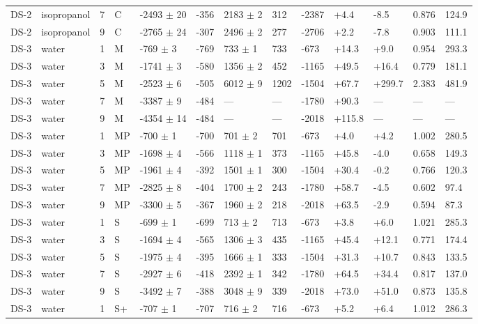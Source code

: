 \documentclass[11pt,a4paper]{article}
\begin{document}
\begin{landscape}
{\begin{longtable}{@{}lllllllllllll@{}}
DS-2 & isopropanol & 7 & C & -2493 $\pm$ 20 & -356 & 2183 $\pm$ 2 & 312 & -2387 & +4.4 & -8.5 & 0.876 & 124.9 \\
DS-2 & isopropanol & 9 & C & -2765 $\pm$ 24 & -307 & 2496 $\pm$ 2 & 277 & -2706 & +2.2 & -7.8 & 0.903 & 111.1 \\
DS-3 & water & 1 & M & -769 $\pm$ 3 & -769 & 733 $\pm$ 1 & 733 & -673 & +14.3 & +9.0 & 0.954 & 293.3 \\
DS-3 & water & 3 & M & -1741 $\pm$ 3 & -580 & 1356 $\pm$ 2 & 452 & -1165 & +49.5 & +16.4 & 0.779 & 181.1 \\
DS-3 & water & 5 & M & -2523 $\pm$ 6 & -505 & 6012 $\pm$ 9 & 1202 & -1504 & +67.7 & +299.7 & 2.383 & 481.9 \\
DS-3 & water & 7 & M & -3387 $\pm$ 9 & -484 & --- & --- & -1780 & +90.3 & --- & --- & --- \\
DS-3 & water & 9 & M & -4354 $\pm$ 14 & -484 & --- & --- & -2018 & +115.8 & --- & --- & --- \\
DS-3 & water & 1 & MP & -700 $\pm$ 1 & -700 & 701 $\pm$ 2 & 701 & -673 & +4.0 & +4.2 & 1.002 & 280.5 \\
DS-3 & water & 3 & MP & -1698 $\pm$ 4 & -566 & 1118 $\pm$ 1 & 373 & -1165 & +45.8 & -4.0 & 0.658 & 149.3 \\
DS-3 & water & 5 & MP & -1961 $\pm$ 4 & -392 & 1501 $\pm$ 1 & 300 & -1504 & +30.4 & -0.2 & 0.766 & 120.3 \\
DS-3 & water & 7 & MP & -2825 $\pm$ 8 & -404 & 1700 $\pm$ 2 & 243 & -1780 & +58.7 & -4.5 & 0.602 & 97.4 \\
DS-3 & water & 9 & MP & -3300 $\pm$ 5 & -367 & 1960 $\pm$ 2 & 218 & -2018 & +63.5 & -2.9 & 0.594 & 87.3 \\
DS-3 & water & 1 & S & -699 $\pm$ 1 & -699 & 713 $\pm$ 2 & 713 & -673 & +3.8 & +6.0 & 1.021 & 285.3 \\
DS-3 & water & 3 & S & -1694 $\pm$ 4 & -565 & 1306 $\pm$ 3 & 435 & -1165 & +45.4 & +12.1 & 0.771 & 174.4 \\
DS-3 & water & 5 & S & -1975 $\pm$ 4 & -395 & 1666 $\pm$ 1 & 333 & -1504 & +31.3 & +10.7 & 0.843 & 133.5 \\
DS-3 & water & 7 & S & -2927 $\pm$ 6 & -418 & 2392 $\pm$ 1 & 342 & -1780 & +64.5 & +34.4 & 0.817 & 137.0 \\
DS-3 & water & 9 & S & -3492 $\pm$ 7 & -388 & 3048 $\pm$ 9 & 339 & -2018 & +73.0 & +51.0 & 0.873 & 135.8 \\
DS-3 & water & 1 & S+ & -707 $\pm$ 1 & -707 & 716 $\pm$ 2 & 716 & -673 & +5.2 & +6.4 & 1.012 & 286.3 \\

\end{longtable}}
\end{landscape}
\end{document}
